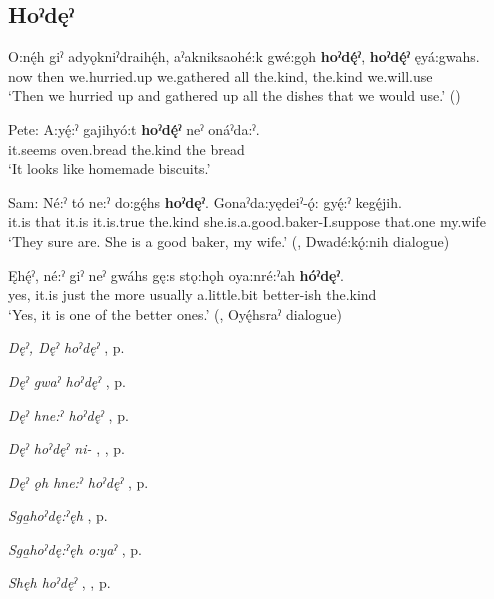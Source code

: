 \subsection*{\textbf{Hoˀdęˀ} } \label{p:[hoˀdęˀ]}

\ea
\label{ex:hpar52}
\gll O:nę́h giˀ adyǫkniˀdraihę́h, aˀakniksaohé:k gwé:gǫh \textbf{hoˀdę́ˀ}, \textbf{hoˀdę́ˀ} ęyá:gwahs.\\
now then we.hurried.up we.gathered all the.kind, the.kind we.will.use\\
\glt ‘Then we hurried up and gathered up all the dishes that we would use.’  (\cite{henry_de_2005})
\z


\ea
\label{ex:hpar53}
\gll Pete: A:yę́:ˀ gajihyó:t \textbf{hoˀdę́ˀ} neˀ onáˀda:ˀ.\\
{} it.seems oven.bread the.kind the bread\\
\glt ‘It looks like homemade biscuits.’

\gll Sam: Né:ˀ tó ne:ˀ do:gę́hs \textbf{hoˀdęˀ}. Gonaˀda:yędeiˀ-ǫ́: gyę́:ˀ kegę́jih.\\
{} it.is that it.is it.is.true the.kind she.is.a.good.baker-I.suppose that.one my.wife\\
\glt ‘They sure are. She is a good baker, my wife.’ (\cite[294]{mithun_watewayestanih_1984}, Dwadé:kǫ́:nih dialogue)
\z

\ea
\label{ex:hpar54}
\gll Ęhę́ˀ, né:ˀ giˀ neˀ gwáhs gę:s stǫ:hǫh oya:nré:ˀah \textbf{hóˀdęˀ}.\\
yes, it.is just the more usually a.little.bit better-ish the.kind\\
\glt ‘Yes, it is one of the better ones.’ (\cite[456]{mithun_watewayestanih_1984}, Oyę́hsraˀ dialogue)
\z


\begin{CayugaRelated}
\item \textit{Dęˀ, Dęˀ hoˀdęˀ} , p. \pageref{p:[dęˀ, dęˀ hoˀdęˀ]}\\
\item \textit{Dęˀ gwaˀ hoˀdęˀ} , p. \pageref{p:[dęˀ gwaˀ hoˀdęˀ]}\\
\item \textit{Dęˀ hne:ˀ hoˀdęˀ} , p. \pageref{p:[dęˀ hne:ˀ hoˀdęˀ]}\\
\item \textit{Dęˀ hoˀdęˀ ni-} , , p. \pageref{p:[dęˀ hoˀdęˀ ni-]}\\
\item \textit{Dęˀ ǫh hne:ˀ hoˀdęˀ} , p. \pageref{p:[dęˀ ǫh hne:ˀ hoˀdęˀ]}\\
\item \textit{Sga̱hoˀdę:ˀęh} , p. \pageref{p:[sgahoˀdę:ˀęh]}\\
\item \textit{Sga̱hoˀdę:ˀęh o:yaˀ} , p. \pageref{p:[sgahoˀdę:ˀęh o:yaˀ]}\\
\item \textit{Shęh hoˀdęˀ} , , p. \pageref{p:[shęh hoˀdęˀ]}
\end{CayugaRelated}


